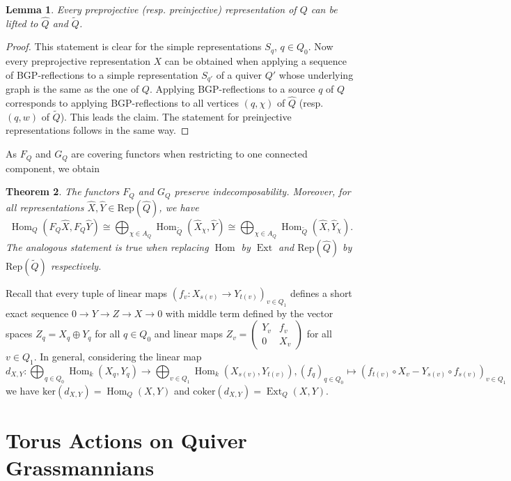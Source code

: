 \documentclass{amsart}
\newtheorem{theorem}{Theorem}[section]
\newtheorem{lemma}[theorem]{Lemma}
\newcommand{\Rep}{\mathrm{Rep}}
\newcommand{\Ext}{\operatorname{Ext}}
\newcommand{\Hom}{\operatorname{Hom}}
\newcommand{\ses}[3]{0\rightarrow #1\rightarrow #2\rightarrow#3\rightarrow 0}
\begin{document}
\begin{lemma}
  Every preprojective (resp. preinjective) representation of $Q$ can be lifted to  $\hat Q$ and $\tilde Q$.
\end{lemma}
\begin{proof}This statement is clear for the simple representations $S_q$, $q\in Q_0$. Now every preprojective representation $X$ can be obtained when applying a sequence of BGP-reflections \cite{bgp} to a simple representation $S_{q'}$ of a quiver $Q'$ whose underlying graph is the same as the one of $Q$. Applying BGP-reflections to a source $q$ of $Q$ corresponds to applying BGP-reflections to all vertices $(q,\chi)$ of $\hat Q$ (resp. $(q,w)$ of $\tilde Q$). This leads the claim. The statement for preinjective representations follows in the same way.
\end{proof}
As $F_Q$ and $G_Q$ are covering functors when restricting to one connected component, we obtain
\begin{theorem}\label{covering}
The functors $F_Q$ and $G_Q$ preserve indecomposability. Moreover, for all representations $\hat X,\hat Y \in\Rep(\hat Q)$, we have 
\[\Hom_Q(F_Q\hat X, F_Q\hat Y)\cong \bigoplus_{\chi\in A_Q}\Hom_{\tilde Q}(\hat X_\chi,\hat Y)\cong\bigoplus_{\chi\in A_Q}\Hom_{\tilde Q}(\hat X,\hat Y_\chi).\]
The analogous statement is true when replacing $\Hom$ by $\Ext$ and $\Rep(\hat Q)$ by $\Rep(\tilde Q)$ respectively.
\end{theorem}

Recall that every tuple of linear maps $(f_v:X_{s(v)}\to Y_{t(v)})_{v\in Q_1}$ defines a short exact sequence $\ses{Y}{Z}{X}$ with middle term defined by the vector spaces $Z_q=X_q\oplus Y_q$ for all $q\in Q_0$ and linear maps $Z_v=\begin{pmatrix}Y_v &f_v\\0&X_v\end{pmatrix}$ for all $v\in Q_1$. 
In general, considering the linear map  
\[d_{X,Y}:\bigoplus_{q\in Q_0}\Hom_k(X_q,Y_q)\to\bigoplus_{v\in Q_1}\Hom_k(X_{s(v)},Y_{t(v)}), (f_q)_{q\in Q_0}\mapsto(f_{t(v)}\circ X_{v}-Y_{s(v)}\circ f_{s(v)})_{v\in Q_1} \]
we have $\mathrm{ker}(d_{X,Y})=\Hom_Q(X,Y)$ and $\mathrm{coker}(d_{X,Y})=\Ext_Q(X,Y)$.


\section{Torus Actions on Quiver Grassmannians}
\label{torusaction}
\end{document}
